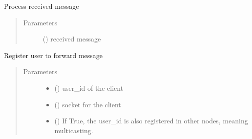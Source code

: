 \documentclass[letterpaper,10pt,english]{sphinxmanual}
\begin{document}
\begin{fulllineitems}

\begin{fulllineitems}
\label{\detokenize{bbc1.core.user_message_routing:bbc1.core.user_message_routing.UserMessageRouting.process_message}}
Process received message
\begin{quote}\begin{description}
\item[{Parameters}] \leavevmode
{} () \textendash{} received message

\end{description}\end{quote}

\end{fulllineitems}


\begin{fulllineitems}
\label{\detokenize{bbc1.core.user_message_routing:bbc1.core.user_message_routing.UserMessageRouting.register_user}}
Register user to forward message
\begin{quote}\begin{description}
\item[{Parameters}] \leavevmode\begin{itemize}
\item {} 
 () \textendash{} user\_id of the client

\item {} 
 () \textendash{} socket for the client

\item {} 
 () \textendash{} If True, the user\_id is also registered in other nodes, meaning multicasting.

\end{itemize}


\end{description}
\end{quote}
\end{fulllineitems}
\end{fulllineitems}
\end{document}
